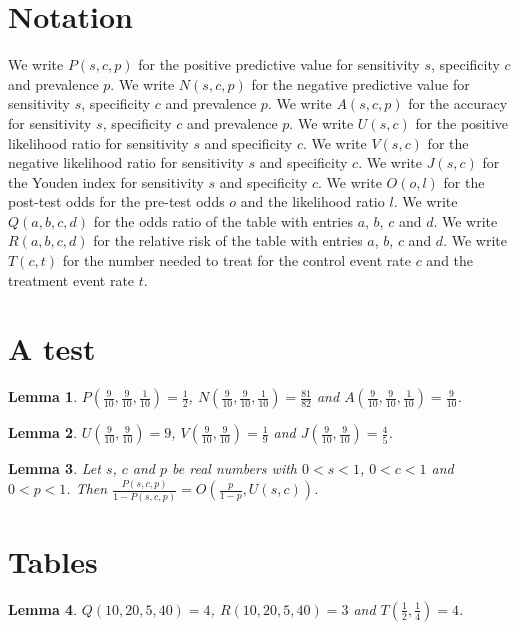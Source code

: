 \documentclass{article}
\newtheorem{lemma}{Lemma}
\begin{document}
\section{Notation}

We write $P(s,c,p)$ for the positive predictive value for sensitivity $s$, specificity $c$ and prevalence $p$.
We write $N(s,c,p)$ for the negative predictive value for sensitivity $s$, specificity $c$ and prevalence $p$.
We write $A(s,c,p)$ for the accuracy for sensitivity $s$, specificity $c$ and prevalence $p$.
We write $U(s,c)$ for the positive likelihood ratio for sensitivity $s$ and specificity $c$.
We write $V(s,c)$ for the negative likelihood ratio for sensitivity $s$ and specificity $c$.
We write $J(s,c)$ for the Youden index for sensitivity $s$ and specificity $c$.
We write $O(o,l)$ for the post-test odds for the pre-test odds $o$ and the likelihood ratio $l$.
We write $Q(a,b,c,d)$ for the odds ratio of the table with entries $a$, $b$, $c$ and $d$.
We write $R(a,b,c,d)$ for the relative risk of the table with entries $a$, $b$, $c$ and $d$.
We write $T(c,t)$ for the number needed to treat for the control event rate $c$ and the treatment event rate $t$.

\section{A test}

\begin{lemma}\label{test}
$P(\frac{9}{10},\frac{9}{10},\frac{1}{10})=\frac12$, $N(\frac{9}{10},\frac{9}{10},\frac{1}{10})=\frac{81}{82}$ and $A(\frac{9}{10},\frac{9}{10},\frac{1}{10})=\frac{9}{10}$.
\end{lemma}

\begin{lemma}\label{ratios}
$U(\frac{9}{10},\frac{9}{10})=9$, $V(\frac{9}{10},\frac{9}{10})=\frac19$ and $J(\frac{9}{10},\frac{9}{10})=\frac45$.
\end{lemma}

\begin{lemma}\label{bayes}
Let $s$, $c$ and $p$ be real numbers with $0<s<1$, $0<c<1$ and $0<p<1$. Then $\frac{P(s,c,p)}{1-P(s,c,p)}=O(\frac{p}{1-p},U(s,c))$.
\end{lemma}

\section{Tables}

\begin{lemma}\label{tables}
$Q(10,20,5,40)=4$, $R(10,20,5,40)=3$ and $T(\frac12,\frac14)=4$.
\end{lemma}
\end{document}
